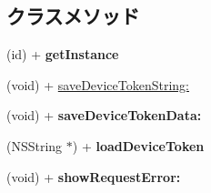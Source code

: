 \subsection*{クラスメソッド}
\begin{DoxyCompactItemize}
\item 
\hypertarget{interface_model_base_a7d53f9d48f3341dee87abb5523dd603e}{}(id) + {\bfseries get\+Instance}\label{interface_model_base_a7d53f9d48f3341dee87abb5523dd603e}

\item 
(void) + \hyperlink{interface_model_base_a69a9f104c08ec4c2a34f2f8ba91f161f}{save\+Device\+Token\+String\+:}
\item 
\hypertarget{interface_model_base_ac61dbf7124aa66eab99fdac3738dbf77}{}(void) + {\bfseries save\+Device\+Token\+Data\+:}\label{interface_model_base_ac61dbf7124aa66eab99fdac3738dbf77}

\item 
\hypertarget{interface_model_base_a9e6073f125d0a5fbc195bf75480220dc}{}(N\+S\+String $\ast$) + {\bfseries load\+Device\+Token}\label{interface_model_base_a9e6073f125d0a5fbc195bf75480220dc}

\item 
\hypertarget{interface_model_base_ae466da94310988bb84d88ec4827b34a5}{}(void) + {\bfseries show\+Request\+Error\+:}\label{interface_model_base_ae466da94310988bb84d88ec4827b34a5}

\end{DoxyCompactItemize}
